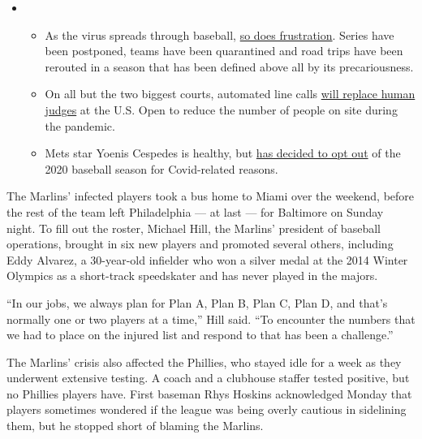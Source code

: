 \begin{itemize}
\item
  \begin{itemize}
  \tightlist
  \item
    As the virus spreads through baseball,
    \href{https://www.nytimes3xbfgragh.onion/2020/08/03/sports/baseball/mlb-coronavirus-outbreak.html?action=click\&pgtype=Article\&state=default\&region=MAIN_CONTENT_2\&context=storylines_keepup}{so
    does frustration}. Series have been postponed, teams have been
    quarantined and road trips have been rerouted in a season that has
    been defined above all by its precariousness.
  \item
    On all but the two biggest courts, automated line calls
    \href{https://www.nytimes3xbfgragh.onion/2020/08/03/sports/tennis/us-open-hawkeye-line-judges.html?action=click\&pgtype=Article\&state=default\&region=MAIN_CONTENT_2\&context=storylines_keepup}{will
    replace human judges} at the U.S. Open to reduce the number of
    people on site during the pandemic.
  \item
    Mets star Yoenis Cespedes is healthy, but
    \href{https://www.nytimes3xbfgragh.onion/2020/08/02/sports/baseball/Yoenis-cespedes-opt-out-rule.html?action=click\&pgtype=Article\&state=default\&region=MAIN_CONTENT_2\&context=storylines_keepup}{has
    decided to opt out} of the 2020 baseball season for Covid-related
    reasons.
  \end{itemize}
\end{itemize}

The Marlins' infected players took a bus home to Miami over the weekend,
before the rest of the team left Philadelphia --- at last --- for
Baltimore on Sunday night. To fill out the roster, Michael Hill, the
Marlins' president of baseball operations, brought in six new players
and promoted several others, including Eddy Alvarez, a 30-year-old
infielder who won a silver medal at the 2014 Winter Olympics as a
short-track speedskater and has never played in the majors.

``In our jobs, we always plan for Plan A, Plan B, Plan C, Plan D, and
that's normally one or two players at a time,'' Hill said. ``To
encounter the numbers that we had to place on the injured list and
respond to that has been a challenge.''

The Marlins' crisis also affected the Phillies, who stayed idle for a
week as they underwent extensive testing. A coach and a clubhouse
staffer tested positive, but no Phillies players have. First baseman
Rhys Hoskins acknowledged Monday that players sometimes wondered if the
league was being overly cautious in sidelining them, but he stopped
short of blaming the Marlins.

